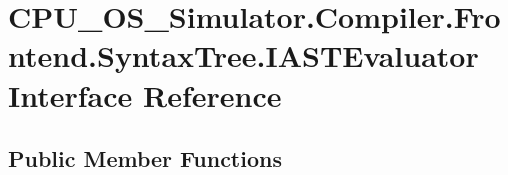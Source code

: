 \hypertarget{interface_c_p_u___o_s___simulator_1_1_compiler_1_1_frontend_1_1_syntax_tree_1_1_i_a_s_t_evaluator}{}\section{C\+P\+U\+\_\+\+O\+S\+\_\+\+Simulator.\+Compiler.\+Frontend.\+Syntax\+Tree.\+I\+A\+S\+T\+Evaluator Interface Reference}
\label{interface_c_p_u___o_s___simulator_1_1_compiler_1_1_frontend_1_1_syntax_tree_1_1_i_a_s_t_evaluator}
\subsection*{Public Member Functions}
